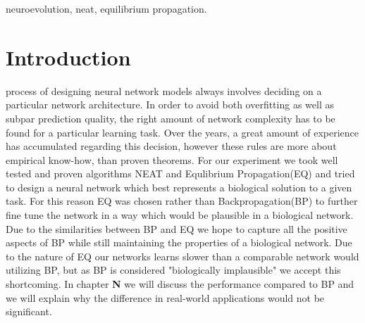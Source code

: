 \documentclass[lettersize,journal]{IEEEtran}
\begin{document}

\begin{IEEEkeywords}
neuroevolution, neat, equilibrium propagation.
\end{IEEEkeywords}

\section{Introduction}
 process of designing neural network models always involves deciding on a particular network architecture. In order to avoid both overfitting as well as subpar prediction quality, the right amount of network complexity has to be found for a particular learning task. Over the years, a great amount of experience has accumulated regarding this decision, however these rules are more about empirical know-how, than proven theorems. For our experiment we took well tested and proven algorithms NEAT and Equlibrium Propagation(EQ) and tried to design a neural network which best represents a biological solution to a given task. For this reason EQ was chosen rather than Backpropagation(BP) to further fine tune the network in a way which would be plausible in a biological network. Due to the similarities between BP and EQ we hope to capture all the positive aspects of BP while still maintaining the properties of a biological network. Due to the nature of EQ our networks learns slower than a comparable network would utilizing BP, but as BP is considered "biologically implausible" we accept this shortcoming. In chapter \textbf{N} we will discuss the performance compared to BP and we will explain why the difference in real-world applications would not be significant.
\end{document}

